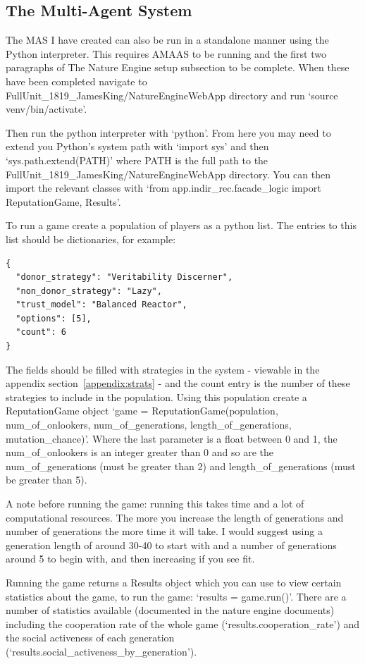 \documentclass[]{final_report}
\begin{document}
\subsection{The Multi-Agent System}
The MAS I have created can also be run in a standalone manner using the Python interpreter. This requires AMAAS to be running and the first two paragraphs of The Nature Engine setup subsection to be complete. When these have been completed navigate to  FullUnit\_1819\_JamesKing/NatureEngineWebApp directory and run `source venv/bin/activate'.\par 
Then run the python interpreter with `python'. From here you may need to extend you Python's system path with `import sys' and then `sys.path.extend(PATH)' where PATH is the full path to the FullUnit\_1819\_JamesKing/NatureEngineWebApp directory. You can then import the relevant classes with `from app.indir\_rec.facade\_logic import ReputationGame, Results'.\par 
To run a game create a population of players as a python list. The entries to this list should be dictionaries, for example:
\begin{verbatim}
{
  "donor_strategy": "Veritability Discerner",
  "non_donor_strategy": "Lazy",
  "trust_model": "Balanced Reactor",
  "options": [5],
  "count": 6
}
\end{verbatim}
The fields should be filled with strategies in the system - viewable in the appendix section~\ref{appendix:strats} - and the count entry is the number of these strategies to include in the population. Using this population create a ReputationGame object `game = ReputationGame(population, num\_of\_onlookers, num\_of\_generations, length\_of\_generations, mutation\_chance)'. Where the last parameter is a float between 0 and 1, the num\_of\_onlookers is an integer greater than 0 and so are the num\_of\_generations (must be greater than 2) and length\_of\_generations (must be greater than 5).\par 
A note before running the game: running this takes time and a lot of computational resources. The more you increase the length of generations and number of generations the more time it will take. I would suggest using a generation length of around 30-40 to start with and a number of generations around 5 to begin with, and then increasing if you see fit.\par 
Running the game returns a Results object which you can use to view certain statistics about the game, to run the game: `results = game.run()'. There are a number of statistics available (documented in the nature engine documents) including the cooperation rate of the whole game (`results.cooperation\_rate') and the social activeness of each generation (`results.social\_activeness\_by\_generation').
\end{document}
